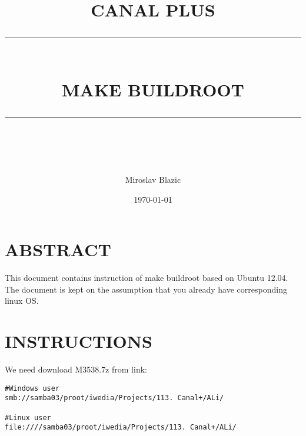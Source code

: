\documentclass[12pt]{report}
\begin{document}
\newcommand{\HRule}[1]{\rule{\linewidth}{#1}}
\onehalfspacing

\pagestyle{fancy}
\fancyhf{}
\setlength\headheight{15pt}


\title{ \normalsize \textsc{CANAL PLUS}
		\\ [1.0cm]
		\HRule{0.5pt} \\
		\LARGE \textbf{\uppercase{MAKE BUILDROOT}}
		\HRule{2pt} \\ [0.5cm]
		\normalsize  \vspace*{5\baselineskip}}


\author{Miroslav Blazic}
\date{\today\\
	}
\maketitle



\newpage
\tableofcontents
\newpage



\section*{ABSTRACT}
This document contains instruction of make buildroot based on Ubuntu 12.04. \newline
The document is kept on the assumption that you already have corresponding linux OS. 

\newpage



\section{INSTRUCTIONS}
We need download M3538.7z from link:
\begin{lstlisting}[caption= Download M3538.7z]
#Windows user
smb://samba03/proot/iwedia/Projects/113. Canal+/ALi/ 

#Linux user
file:////samba03/proot/iwedia/Projects/113. Canal+/ALi/
\end{lstlisting}
\end{document}

